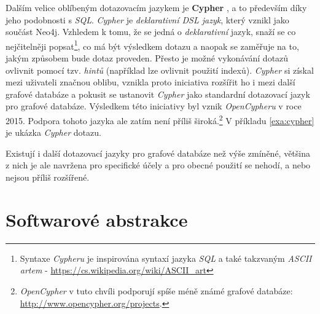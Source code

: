 Dalším velice oblíbeným dotazovacím jazykem je \textbf{Cypher} \cite{Cypher}, a to především díky jeho podobnosti s \textit{SQL}. \textit{Cypher} je \textit{deklarativní DSL jazyk}, který vznikl jako součást Neo4j. Vzhledem k tomu, že se jedná o \textit{deklarativní} jazyk, snaží se co nejčitelněji popsat\footnote{Syntaxe \textit{Cypheru} je inspirována syntaxí jazyka \textit{SQL} a také takzvaným \textit{ASCII artem} - \url{https://cs.wikipedia.org/wiki/ASCII_art}}, co má být výsledkem dotazu a naopak se zaměřuje na to, jakým způsobem bude dotaz proveden. Přesto je možné vykonávání dotazů ovlivnit pomocí tzv. \textit{hintů} (například lze ovlivnit použití indexů). \textit{Cypher} si získal mezi uživateli  značnou oblibu, vznikla proto iniciativa rozšířit ho i mezi další grafové databáze a pokusit se ustanovit \textit{Cypher} jako standardní dotazovací jazyk pro grafové databáze. Výsledkem této iniciativy byl vznik \textit{OpenCypheru} \cite{openCypher} v roce 2015. Podpora tohoto jazyka ale zatím není příliš široká.\footnote{\textit{OpenCypher} v tuto chvíli podporují spíše méně známé grafové databáze: \url{http://www.opencypher.org/projects}.} V příkladu \ref{exa:cypher} je ukázka \textit{Cypher} dotazu.



Existují i další dotazovací jazyky pro grafové databáze než výše zmíněné, většina z nich je ale navržena pro specifické účely a pro obecné použití se nehodí, a nebo nejsou příliš rozšířené.


\chapter{Softwarové abstrakce}

